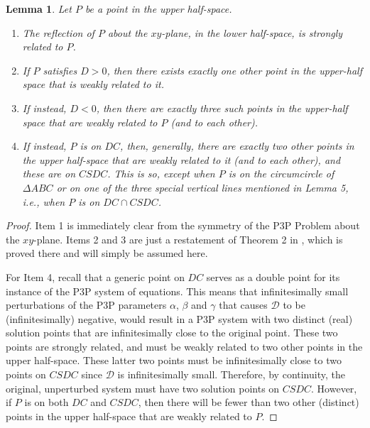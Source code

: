 \documentclass[a4paper, twoside]{article}
\newtheorem{lemma}{Lemma}
\begin{document}
\begin{lemma}

Let $P$ be a point in the upper half-space. 

\begin{enumerate} 

\item The reflection of $P$ about the $xy$-plane, in the lower half-space, is strongly related to $P$. 

\item If $P$ satisfies $D > 0$, then there exists exactly one other point in the upper-half space that is weakly related to it. 

\item If instead, $D < 0$, then there are exactly three such points in the upper-half space that are weakly related to $P$ (and to each other). 

\item If instead, $P$ is on $DC$, then, generally, there are exactly two other points in the upper half-space that are weakly related to it (and to each other), and these are on $CSDC$. This is so, except when $P$ is on the circumcircle of $\Delta ABC$ or on one of the three special vertical lines mentioned in Lemma 5, {\it i.e.}, when $P$ is on $DC \cap CSDC$.

\end{enumerate} 

\end{lemma} 

\begin{proof}

Item 1 is immediately clear from the symmetry of the P3P Problem about the $xy$-plane. Items 2 and 3 are just a restatement of Theorem 2 in \cite{RW}, which is proved there and will simply be assumed here. 

For Item 4, recall that a generic point on $DC$ serves as a double point for its instance of the P3P system of equations. This means that infinitesimally small perturbations of the P3P parameters $\alpha$, $\beta$ and $\gamma$ that causes $\mathcal{D}$ to be (infinitesimally) negative, would result in a P3P system with two distinct (real) solution points that are infinitesimally close to the original point. These two points are strongly related, and must be weakly related to two other points in the upper half-space. These latter two points must be infinitesimally close to two points on $CSDC$ since $\mathcal{D}$ is infinitesimally small. Therefore, by continuity, the original, unperturbed system must have two solution points on $CSDC$. However, if $P$ is on both $DC$ and $CSDC$, then there will be fewer than two other (distinct) points in the upper half-space that are weakly related to $P$.

\end{proof}
\end{document}
